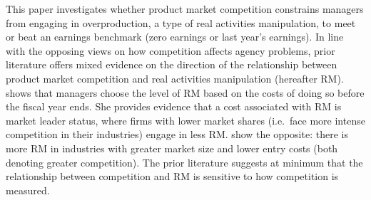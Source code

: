\documentclass[notitlepage, 12pt]{article}
\begin{document}
\noindent This paper investigates whether product market competition constrains managers from engaging in overproduction, a type of real activities manipulation, to meet or beat an earnings benchmark (zero earnings or last year's earnings). In line with the opposing views on how competition affects agency problems, prior literature offers mixed evidence on the direction of the relationship between product market competition and real activities manipulation (hereafter RM). \citet{zang:2012} shows that managers choose the level of RM based on the costs of doing so before the fiscal year ends. She provides evidence that a cost associated with RM is market leader status, where firms with lower market shares (i.e.\ face more intense competition in their industries) engage in less RM. \citet{kst:2012} show the opposite: there is more RM in industries with greater market size and lower entry costs (both denoting greater competition). The prior literature suggests at minimum that the relationship between competition and RM is sensitive to how competition is measured.
\newline


\end{document}
